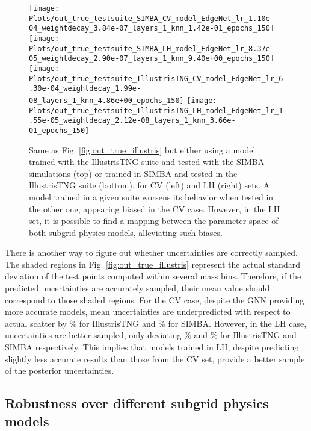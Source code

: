 \documentclass[twocolumn]{aastex631}
\begin{document}
\begin{figure*}[th!]
\begin{center}
\texttt{[image: Plots/out\_true\_testsuite\_SIMBA\_CV\_model\_EdgeNet\_lr\_1.10e-04\_weightdecay\_3.84e-07\_layers\_1\_knn\_1.42e-01\_epochs\_150]}
\texttt{[image: Plots/out\_true\_testsuite\_SIMBA\_LH\_model\_EdgeNet\_lr\_8.37e-05\_weightdecay\_2.90e-07\_layers\_1\_knn\_9.40e+00\_epochs\_150]}
\texttt{[image: Plots/out\_true\_testsuite\_IllustrisTNG\_CV\_model\_EdgeNet\_lr\_6.30e-04\_weightdecay\_1.99e-08\_layers\_1\_knn\_4.86e+00\_epochs\_150]}
\texttt{[image: Plots/out\_true\_testsuite\_IllustrisTNG\_LH\_model\_EdgeNet\_lr\_1.55e-05\_weightdecay\_2.12e-08\_layers\_1\_knn\_3.66e-01\_epochs\_150]}
\caption{Same as Fig. \ref{fig:out_true_illustris} but either using a model trained with the IllustrisTNG suite and tested with the SIMBA simulations (top) or trained in SIMBA and tested in the IllustrisTNG suite (bottom), for CV (left) and LH (right) sets. A model trained in a given suite worsens its behavior when tested in the other one, appearing biased in the CV case. However, in the LH set, it is possible to find a mapping between the parameter space of both subgrid physics models, alleviating such biases.}
\label{fig:out_true_simba}
\end{center}
\end{figure*}

There is another way to figure out whether uncertainties are correctly sampled. The shaded regions in Fig. \ref{fig:out_true_illustris} represent the actual standard deviation of the test points computed within several mass bins. Therefore, if the predicted uncertainties are accurately sampled, their mean value  should correspond to those shaded regions. For the CV case, despite the GNN providing more accurate models, mean uncertainties  are underpredicted with respect to actual scatter by  \% for IllustrisTNG and  \%  for SIMBA. However, in the LH case, uncertainties are better sampled, only deviating  \% and  \% for IllustrisTNG and SIMBA respectively. This implies that models trained in LH, despite predicting slightly less accurate results than those from the CV set, provide a better sample of the posterior uncertainties.








\subsection{Robustness over different subgrid physics models}
\label{sec:robust}
\end{document}
